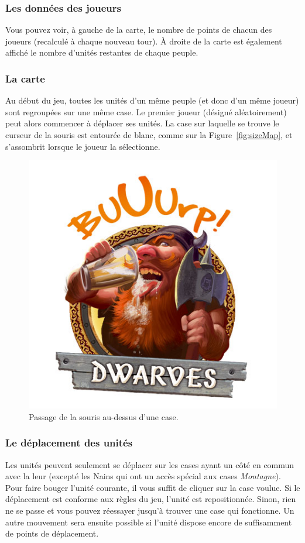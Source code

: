 \subsubsection{Les données des joueurs}

Vous pouvez voir, à gauche de la carte, le nombre de points de chacun des joueurs (recalculé à chaque nouveau tour). À droite de la carte est également affiché le nombre d'unités restantes de chaque peuple. 

\subsubsection{La carte}

Au début du jeu, toutes les unités d'un même peuple (et donc d'un même joueur) sont regroupées sur une même case. Le premier joueur (désigné aléatoirement) peut alors commencer à déplacer ses unités. La case sur laquelle se trouve le curseur de la souris est entourée de blanc, comme sur la {\sc Figure}~\ref{fig:sizeMap}, et s'assombrit lorsque le joueur la sélectionne.

\begin{figure}
    \centering
    \includegraphics[height=0.70\textwidth]{figure/choicePeoples.png}
    \caption{Passage de la souris au-dessus d'une case.}
    \label{fig:onSpace}
\end{figure}

\subsubsection{Le déplacement des unités}

Les unités peuvent seulement se déplacer sur les cases ayant un côté en commun avec la leur (excepté les Nains qui ont un accès spécial aux cases \textit{Montagne}). Pour faire bouger l'unité courante, il vous suffit de cliquer sur la case voulue. Si le déplacement est conforme aux règles du jeu, l'unité est repositionnée. Sinon, rien ne se passe et vous pouvez réessayer jusqu'à trouver une case qui fonctionne. Un autre mouvement sera ensuite possible si l'unité dispose encore de suffisamment de points de déplacement.

